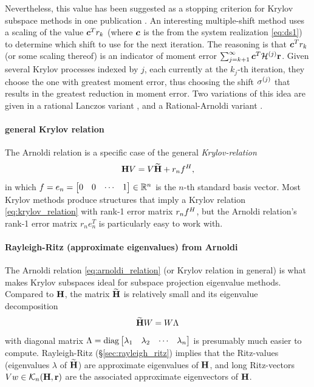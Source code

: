Nevertheless, this value has been suggested as a stopping criterion for Krylov subspace methods in one publication \cite{stopping_criterion}.   An interesting multiple-shift method uses a scaling of the value $\bm{c}^T r_k$ (where $\bm{c}$ is the from the system realization \eqref{eq:ds1}) to determine which shift to use for the next iteration.  The reasoning is that $\bm{c}^T r_k$ (or some scaling thereof) is an indicator of moment error $\sum_{j=k+1}^\infty \bm{c}^T \mathcal{H}^{(j)} \textbf{\textup{r}}$.  Given several Krylov processes indexed by $j$, each currently at the $k_j$-th iteration, they choose the one with greatest moment error, thus choosing the shift $\sigma^{(j)}$ that results in the greatest reduction in moment error.  Two variations of this idea are given in a rational Lanczos variant \cite{gallivan1996rational},  and a Rational-Arnoldi variant \cite{AORA,RAMAO}.    



\paragraph{general Krylov relation}
The Arnoldi relation is a specific case of the general \emph{Krylov-relation} 
\begin{equation}
\textbf{\textup{H}} V = V\widetilde{\textbf{\textup{H}}} +  r_n f^H,
\label{eq:krylov_relation}
\end{equation}
in which $f= e_n=\begin{bmatrix} 0&0&\cdots&1\end{bmatrix}\in\mathbb{R}^n$ is the $n$-th standard basis vector. Most Krylov methods produce structures that imply a Krylov relation \eqref{eq:krylov_relation} with rank-1 error matrix $r_n f^H$,  but the Arnoldi relation's rank-1 error matrix $r_n e_n^T$ is particularly easy to work with.  


 
\paragraph{Rayleigh-Ritz (approximate eigenvalues) from Arnoldi} 
The Arnoldi relation \eqref{eq:arnoldi_relation} (or Krylov relation in general) is what makes Krylov subspaces ideal for subspace projection eigenvalue methods.  
 Compared to $\textbf{\textup{H}}$, the matrix $\widetilde{\textbf{\textup{H}}}$ is relatively small and its eigenvalue decomposition 
\[
\widetilde{\textbf{\textup{H}}} W = W \Lambda
\]
with diagonal matrix 
$\Lambda = \text{diag}\begin{bmatrix} \lambda_1&\lambda_2&\cdots&\lambda_n\end{bmatrix}$ is presumably much easier to compute. Rayleigh-Ritz (\S\ref{sec:rayleigh_ritz}) implies that the Ritz-values (eigenvalues $\lambda$ of $\widetilde{\textbf{\textup{H}}}$) are approximate eigenvalues of $\textbf{\textup{H}}$, and long Ritz-vectors $Vw\in\mathcal{K}_{n}({\textbf{\textup{H}}},{\textbf{\textup{r}}})$  are the associated approximate eigenvectors of $\textbf{\textup{H}}$. 

